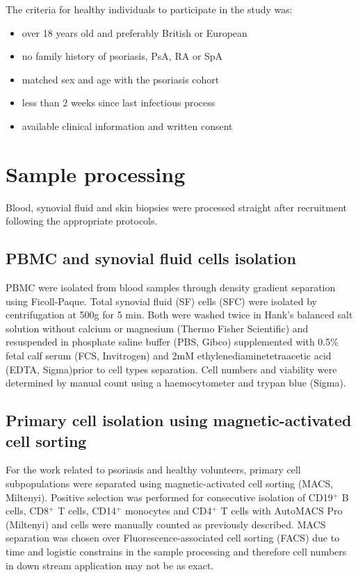 The criteria for healthy individuals to participate in the study was:
\begin{itemize}
  \item over 18 years old and preferably British or European
  \item no family history of psoriasis, PsA, RA or SpA
	\item matched sex and age with the psoriasis cohort
	\item less than 2 weeks since last infectious process
	\item available clinical information and written consent
\end{itemize}


\section{Sample processing}
\label{sample_processing}
Blood, synovial fluid and skin biopsies were processed straight after recruitment following the appropriate protocols.

\subsection{PBMC and synovial fluid cells isolation}
PBMC were isolated from blood samples through density gradient separation using Ficoll-Paque. Total synovial fluid (SF) cells (SFC) were isolated by centrifugation at 500g for 5 min. Both were washed twice in Hank’s balanced salt solution without calcium or magnesium (Thermo Fisher Scientific) and resuspended in phosphate saline buffer (PBS, Gibco) supplemented with 0.5\% fetal calf serum (FCS, Invitrogen) and 2mM ethylenediaminetetraacetic acid (EDTA, Sigma)prior to cell types separation. Cell numbers and viability were determined by manual count using a haemocytometer and trypan blue (Sigma).

\subsection{Primary cell isolation using magnetic-activated cell sorting}
For the work related to psoriasis and healthy volunteers, primary cell subpopulations were separated using magnetic-activated cell sorting (MACS, Miltenyi). Positive selection was performed for consecutive isolation of CD19$^{+}$ B cells, CD8$^{+}$ T cells, CD14$^{+}$  monocytes and CD4$^{+}$ T cells with AutoMACS Pro (Miltenyi) and cells were manually counted as previously described. MACS separation was chosen over Fluorescence-associated cell sorting (FACS) due to time and logistic constrains in the sample processing and therefore cell numbers in down stream application may not be as exact.

